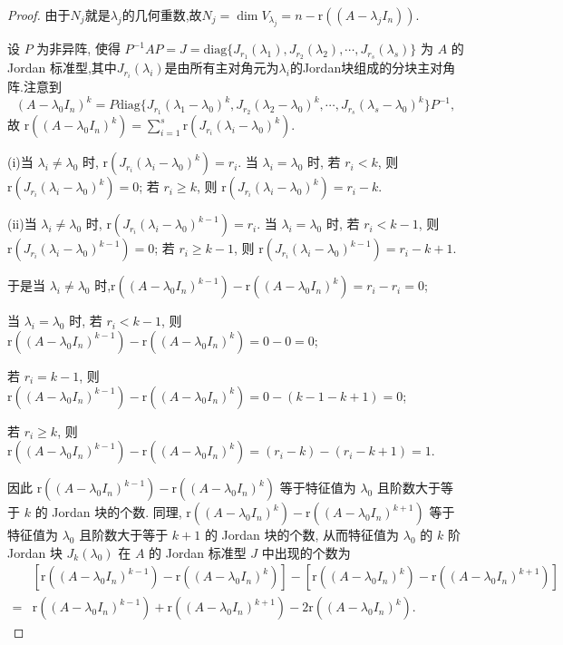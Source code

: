 \documentclass[../../main.tex]{subfiles}%
\begin{document}
\begin{proof}
由于$N_j$就是$\lambda_j$的几何重数,故$N_j=\dim V_{\lambda_j}=n-\mathrm{r}((A - \lambda_j I_n))$.

设 $P$ 为非异阵, 使得 $P^{-1}AP = J = \mathrm{diag}\{J_{r_1}(\lambda_1),J_{r_2}(\lambda_2),\cdots,J_{r_s}(\lambda_s)\}$ 为 $A$ 的 Jordan 标准型,其中$J_{r_i}(\lambda_i)$是由所有主对角元为$\lambda_i$的Jordan块组成的分块主对角阵.注意到
\[
(A - \lambda_0 I_n)^k = P\mathrm{diag}\{J_{r_1}(\lambda_1 - \lambda_0)^k,J_{r_2}(\lambda_2 - \lambda_0)^k,\cdots,J_{r_s}(\lambda_s - \lambda_0)^k\}P^{-1},
\]
故 $\mathrm{r}((A - \lambda_0 I_n)^k) = \sum_{i = 1}^{s}\mathrm{r}(J_{r_i}(\lambda_i - \lambda_0)^k)$.

(i)当 $\lambda_i \neq \lambda_0$ 时, $\mathrm{r}(J_{r_i}(\lambda_i - \lambda_0)^k) = r_i$. 
当 $\lambda_i = \lambda_0$ 时, 
若 $r_i < k$, 则 $\mathrm{r}(J_{r_i}(\lambda_i - \lambda_0)^k) = 0$; 
若 $r_i \geqslant  k$, 则 $\mathrm{r}(J_{r_i}(\lambda_i - \lambda_0)^k) = r_i - k$. 

(ii)当 $\lambda_i \neq \lambda_0$ 时, $\mathrm{r}(J_{r_i}(\lambda_i - \lambda_0)^{k-1}) = r_i$. 
当 $\lambda_i = \lambda_0$ 时, 
若 $r_i < k-1$, 则 $\mathrm{r}(J_{r_i}(\lambda_i - \lambda_0)^{k-1}) = 0$; 
若 $r_i \geqslant  k-1$, 则 $\mathrm{r}(J_{r_i}(\lambda_i - \lambda_0)^{k-1}) = r_i - k+1$. 

于是当 $\lambda_i \neq \lambda_0$ 时,$\mathrm{r}((A - \lambda_0 I_n)^{k - 1}) - \mathrm{r}((A - \lambda_0 I_n)^k)=r_i-r_i=0$;

当 $\lambda_i = \lambda_0$ 时, 
若 $r_i < k-1$, 则$\mathrm{r}((A - \lambda_0 I_n)^{k - 1}) - \mathrm{r}((A - \lambda_0 I_n)^k)=0-0=0$;

若 $r_i =k-1$, 则$\mathrm{r}((A - \lambda_0 I_n)^{k - 1}) - \mathrm{r}((A - \lambda_0 I_n)^k)=0-(k-1-k+1)=0$;

若 $r_i \geqslant  k$, 则$\mathrm{r}((A - \lambda_0 I_n)^{k - 1}) - \mathrm{r}((A - \lambda_0 I_n)^k)=(r_i-k)-(r_i-k+1)=1$.

因此 $\mathrm{r}((A - \lambda_0 I_n)^{k - 1}) - \mathrm{r}((A - \lambda_0 I_n)^k)$ 等于特征值为 $\lambda_0$ 且阶数大于等于 $k$ 的 Jordan 块的个数. 同理, $\mathrm{r}((A - \lambda_0 I_n)^k) - \mathrm{r}((A - \lambda_0 I_n)^{k + 1})$ 等于特征值为 $\lambda_0$ 且阶数大于等于 $k + 1$ 的 Jordan 块的个数, 从而特征值为 $\lambda_0$ 的 $k$ 阶 Jordan 块 $J_k(\lambda_0)$ 在 $A$ 的 Jordan 标准型 $J$ 中出现的个数为
\begin{align*}
&[\mathrm{r}((A - \lambda_0 I_n)^{k - 1}) - \mathrm{r}((A - \lambda_0 I_n)^k)] - [\mathrm{r}((A - \lambda_0 I_n)^k) - \mathrm{r}((A - \lambda_0 I_n)^{k + 1})]\\
=&\mathrm{r}((A - \lambda_0 I_n)^{k - 1}) + \mathrm{r}((A - \lambda_0 I_n)^{k + 1}) - 2\mathrm{r}((A - \lambda_0 I_n)^k). 
\end{align*}
\end{proof}
\end{document}
